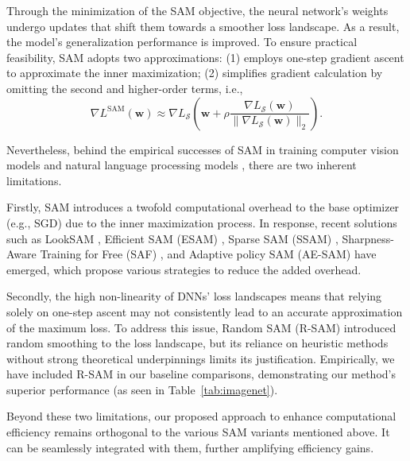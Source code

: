 \documentclass[letterpaper]{article} %
\theoremstyle{plain}
\theoremstyle{definition}
\newcommand{\tref}[1]{Table~\ref{#1}}
\begin{document}
Through the minimization of the SAM objective, the neural network's weights undergo updates that shift them towards a smoother loss landscape. As a result, the model's generalization performance is improved. To ensure practical feasibility, SAM adopts two approximations: (1) employs one-step gradient ascent to approximate the inner maximization; (2) simplifies gradient calculation by omitting the second and higher-order terms, i.e.,
\begin{equation}\label{eq:sam-approx}
\nabla L^{\operatorname{SAM}}(\boldsymbol{w}) \approx \nabla L_{\mathcal{S}}\left(\boldsymbol{w}+\rho \frac{\nabla L_{\mathcal{S}}(\boldsymbol{w})} {\|\nabla L_{\mathcal{S}}(\boldsymbol{w})\|_2}\right).
\end{equation}

Nevertheless, behind the empirical successes of SAM in training computer vision models \cite{foret2021sharpnessaware,chen2022when} and natural language processing models \cite{bahri2021sharpness}, there are two inherent limitations.

Firstly, SAM introduces a twofold computational overhead to the base optimizer (e.g., SGD) due to the inner maximization process. In response, recent solutions such as LookSAM \cite{liu2022towards}, Efficient SAM (ESAM) \cite{du2022efficient}, Sparse SAM (SSAM) \cite{mi2022make}, Sharpness-Aware Training for Free (SAF) \cite{du2022sharpness}, and Adaptive policy SAM (AE-SAM) \cite{jiang2023an} have emerged, which propose various strategies to reduce the added overhead.

Secondly, the high non-linearity of DNNs' loss landscapes means that relying solely on one-step ascent may not consistently lead to an accurate approximation of the maximum loss. To address this issue, Random SAM (R-SAM) \cite{liu2022random} introduced random smoothing to the loss landscape, but its reliance on heuristic methods without strong theoretical underpinnings limits its justification. Empirically, we have included R-SAM in our baseline comparisons, demonstrating our method's superior performance (as seen in \tref{tab:imagenet}).

Beyond these two limitations, our proposed approach to enhance computational efficiency remains orthogonal to the various SAM variants mentioned above. It can be seamlessly integrated with them, further amplifying efficiency gains.
\end{document}
